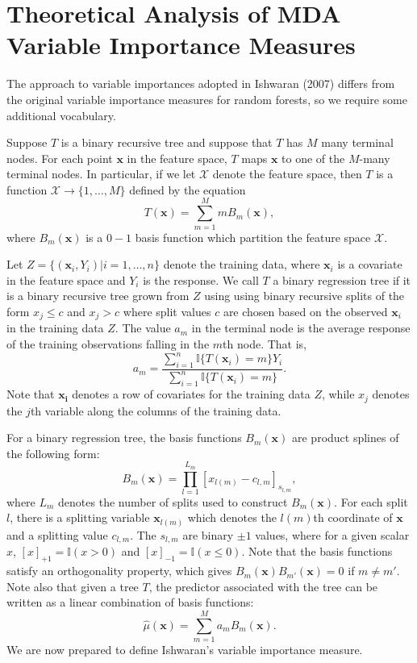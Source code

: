 \documentclass[12pt,twoside]{reedthesis}
\theoremstyle{definition}
\theoremstyle{definition}
\theoremstyle{definition}
\theoremstyle{remark}
\begin{document}
\section{Theoretical Analysis of MDA Variable Importance
Measures}\label{theoretical-analysis-of-mda-variable-importance-measures}

The approach to variable importances adopted in Ishwaran (2007) differs
from the original variable importance measures for random forests, so we
require some additional vocabulary. \par 

Suppose \(T\) is a binary recursive tree and suppose that \(T\) has
\(M\) many terminal nodes. For each point \(\mathbf{x}\) in the feature
space, \(T\) maps \(\mathbf{x}\) to one of the \(M\)-many terminal
nodes. In particular, if we let \(\mathcal{X}\) denote the feature
space, then \(T\) is a function
\(\mathcal{X}\rightarrow \{1,\ldots, M\}\) defined by the equation
\[T(\mathbf{x})=\sum_{m=1}^M m B_m(\mathbf{x}),\] where
\(B_m(\mathbf{x})\) is a \(0-1\) basis function which partition the
feature space \(\mathcal{X}\). \par

Let \(Z=\{(\mathbf{x}_i,Y_i)|i=1,\ldots,n\}\) denote the training data,
where \(\mathbf{x}_i\) is a covariate in the feature space and \(Y_i\)
is the response. We call \(T\) a binary regression tree if it is a
binary recursive tree grown from \(Z\) using using binary recursive
splits of the form \(x_j\leq c\) and \(x_j> c\) where split values \(c\)
are chosen based on the observed \(\mathbf{x}_i\) in the training data
\(Z\). The value \(a_m\) in the terminal node is the average response of
the training observations falling in the \(m\)th node. That is,
\[a_m=\frac{\sum_{i=1}^n \mathbb{I}\{T(\mathbf{x}_i)=m\} Y_i}{\sum_{i=1}^n \mathbb{I}\{T(\mathbf{x}_i)=m\}}.\]
Note that \(\mathbf{x_i}\) denotes a row of covariates for the training
data \(Z\), while \(x_j\) denotes the \(j\)th variable along the columns
of the training data. \par

For a binary regression tree, the basis functions \(B_m(\mathbf{x})\)
are product splines of the following form:
\[B_m(\mathbf{x})=\prod_{l = 1}^{L_m} [x_{l(m)}-c_{l, m}]_{s_{l,m}},\]
where \(L_m\) denotes the number of splits used to construct
\(B_m(\mathbf{x})\). For each split \(l\), there is a splitting variable
\(\mathbf{x}_{l(m)}\) which denotes the \(l(m)\)th coordinate of
\(\mathbf{x}\) and a splitting value \(c_{l,m}\). The \(s_{l,m}\) are
binary \(\pm 1\) values, where for a given scalar \(x\),
\([x]_{+1}=\mathbb{I}(x>0)\) and \([x]_{-1}=\mathbb{I}(x\leq 0).\) Note
that the basis functions satisfy an orthogonality property, which gives
\(B_m(\mathbf{x})B_{m'}(\mathbf{x})=0\) if \(m\neq m'\). Note also that
given a tree \(T\), the predictor associated with the tree can be
written as a linear combination of basis functions:
\[\hat{\mu}(\mathbf{x})=\sum_{m=1}^M a_m B_m(\mathbf{x}).\] We are now
prepared to define Ishwaran's variable importance measure. \par
\end{document}
